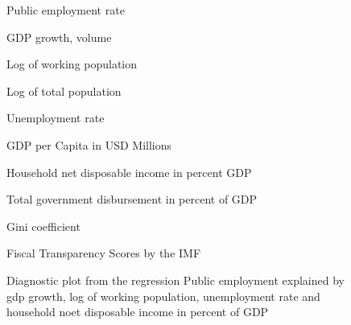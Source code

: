 \documentclass[a4paper, 10pt]{article}
\newcommand{\insertplot}[2]{
  \begin{figure}[!ht]
    \centering
    
    \caption{#2}
  \end{figure}
}
\begin{document}
%     
\begin{landscape}
  \insertplot{simple_model_egr.tex}{Public employment rate}
  \insertplot{simple_model_gdpv_annpct.tex}{GDP growth, volume}
  \insertplot{simple_model_lpop.tex}{Log of working population}
  \insertplot{simple_model_lpoptot.tex}{Log of total population}
  \insertplot{simple_model_unr.tex}{Unemployment rate}
  \insertplot{simple_model_gdp_per_capita.tex}{GDP per Capita in USD Millions}
  \insertplot{simple_model_ydrh_to_gdpv.tex}{Household net disposable income in percent
    GDP}
  \insertplot{simple_model_ypgtq.tex}{Total government disbursement in
    percent of GDP}
  \insertplot{simple_model_incomeineq.tex}{Gini coefficient}
  \insertplot{simple_model_fiscal_transparency.tex}{Fiscal Transparency Scores by the IMF}
  \insertplot{model_diagnostic.tex}{Diagnostic plot from the regression
    Public employment explained by gdp growth, log of working population,
    unemployment rate and household noet disposable income in percent of GDP}
\end{landscape}
\end{document}
